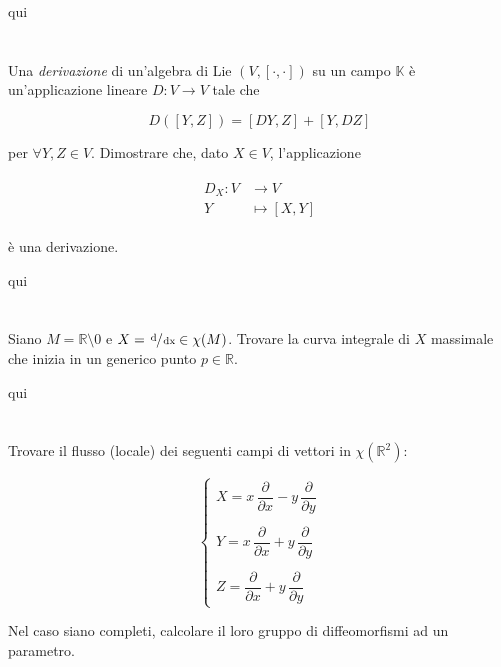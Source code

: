 qui

\tocless\section{}\label{es2-28}

\begin{tcolorbox}
	Una \textit{derivazione} di un'algebra di Lie $ (V,[\cdot,\cdot]) $ su un campo $ \mathbb{K} $ è un'applicazione lineare $ D : V \to V $ tale che
	
	\begin{equation}
		D([Y,Z]) = [DY,Z] + [Y,DZ]
	\end{equation}

	per $ \forall Y,Z \in V $. Dimostrare che, dato $ X \in V $, l'applicazione
	
	\begin{align}
		\begin{split}
			D_{X} : V &\to V\\
			Y &\mapsto [X,Y]
		\end{split}
	\end{align}

	è una derivazione.
\end{tcolorbox}

qui

\tocless\section{}\label{es2-29}

\begin{tcolorbox}
	Siano $ M = \mathbb{R} \setminus 0 $ e $ X = \sfrac{\operatorname{d}}{\operatorname{dx}} \in \chi(M) $. Trovare la curva integrale di $ X $ massimale che inizia in un generico punto $ p \in \mathbb{R} $.
\end{tcolorbox}

qui

\tocless\section{}\label{es2-30}

\begin{tcolorbox}
	Trovare il flusso (locale) dei seguenti campi di vettori in $ \chi(\mathbb{R}^{2}) $:
	
	\begin{equation}
		\begin{cases}
			X = x \, \dfrac{\partial}{\partial x} - y \, \dfrac{\partial}{\partial y}\\\\
			Y = x \, \dfrac{\partial}{\partial x} + y \, \dfrac{\partial}{\partial y}\\\\
			Z = \dfrac{\partial}{\partial x} + y \, \dfrac{\partial}{\partial y}
		\end{cases}
	\end{equation}

	Nel caso siano completi, calcolare il loro gruppo di diffeomorfismi ad un parametro.
\end{tcolorbox}


